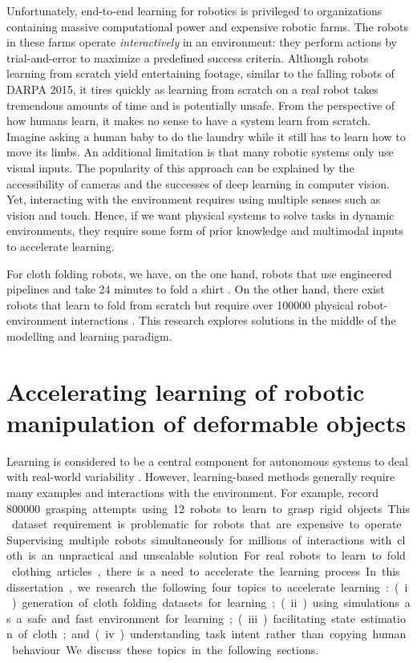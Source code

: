 \documentclass[\home/main.tex]{subfiles}
\begin{document}
Unfortunately, end-to-end learning for robotics is privileged to organizations containing massive computational power and expensive robotic farms. The robots in these farms operate \emph{interactively} in an environment: they perform actions by trial-and-error to maximize a predefined success criteria. Although robots learning from scratch yield entertaining footage, similar to the falling robots of DARPA 2015, it tires quickly as learning from scratch on a real robot takes tremendous amounts of time and is potentially unsafe. From the perspective of how humans learn, it makes no sense to have a system learn from scratch. Imagine asking a human baby to do the laundry while it still has to learn how to move its limbs.
An additional limitation is that many robotic systems only use visual inputs. The popularity of this approach can be explained by the accessibility of cameras and the successes of deep learning in computer vision. Yet, interacting with the environment requires using multiple senses such as vision and touch. 
Hence, if we want physical systems to solve tasks in dynamic environments, they require some form of prior knowledge and multimodal inputs to accelerate learning.

For cloth folding robots, we have, on the one hand, robots that use engineered pipelines and take 24 minutes to fold a shirt \autocite{Maitin2010}. On the other hand, there exist robots that learn to fold from scratch but require over \qty{100000}{} physical robot-environment interactions \autocite{Matas2018}. This research explores solutions in the middle of the modelling and learning paradigm.



\section{Accelerating learning of robotic manipulation of deformable objects} \label{sec:intro_acc_learning}
Learning is considered to be a central component for autonomous systems to deal with real-world variability \autocite{kroemer2021review}. However, learning-based methods generally require many examples and interactions with the environment. For example, \textcite{Levine2018} record \qty{800000} grasping attempts using \qty{12} robots to learn to grasp rigid objects. This dataset requirement is problematic for robots that are expensive to operate. Supervising multiple robots simultaneously for millions of interactions with cloth is an unpractical and unscalable solution. For real robots to learn to fold clothing articles, there is a need to accelerate the learning process. In this dissertation, we research the following four topics to accelerate learning:
(i) generation of cloth folding datasets for learning;
(ii) using simulations as a safe and fast environment for learning;
(iii) facilitating state estimation of cloth; and
(iv) understanding task intent rather than copying human behaviour.
We discuss these topics in the following sections.
\end{document}
